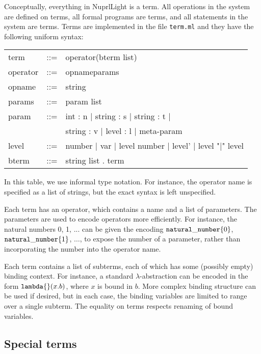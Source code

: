 \documentclass{article}
\newcommand\NuprlLight{NuprlLight}
\begin{document}
\label{section:terms}
Conceptually, everything in \NuprlLight{} is a term.  All operations in the system are defined on
terms, all formal programs are terms, and all statements in the system are terms.  Terms are
implemented in the file {\tt term.ml} and they have the following uniform syntax:

\begin{center}
  {\tt\begin{tabular}{lll}
      term & ::= & operator(bterm list)\\
      operator & ::= & opname{params}\\
      opname & ::= & string\\
      params & ::= & param list\\
      param & ::= & int \hbox{:} n | string \hbox{:} s | string \hbox{:} t |\\
            &     & string \hbox{:} v | level \hbox{:} l | meta-param\\
      level & ::= & number | var | level number | level' | level "|" level\\
      bterm & ::= & string list . term
    \end{tabular}}
\end{center}

In this table, we use informal type notation.  For instance, the operator name is specified as a
list of strings, but the exact syntax is left unspecified.

Each term has an operator, which contains a name and a list of parameters. The parameters are used
to encode operators more efficiently.  For instance, the natural numbers 0, 1, ... can be given the
encoding ${\tt natural\_number}\{0\}$, ${\tt natural\_number}\{1\}$, $\ldots$, to expose the number
of a parameter, rather than incorporating the number into the operator name.

Each term contains a list of subterms, each of which has some (possibly empty) binding context.  For
instance, a standard $\lambda$-abstraction can be encoded in the form ${\tt lambda}\{\}(x.b)$, where
$x$ is bound in $b$.  More complex binding structure can be used if desired, but in each case, the
binding variables are limited to range over a single subterm.  The equality on terms respects
renaming of bound variables.

\subsection{Special terms}
\end{document}
